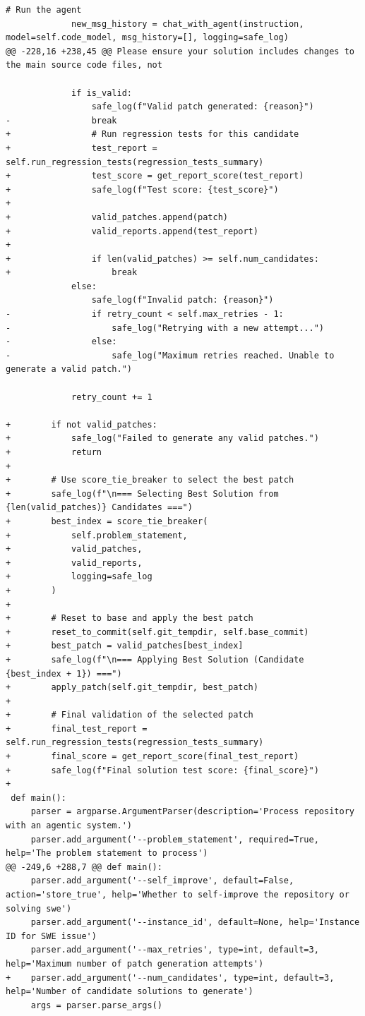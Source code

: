 \documentclass{article}
\begin{document}
\begin{lstlisting}[style=diffstyle]
             # Run the agent
             new_msg_history = chat_with_agent(instruction, model=self.code_model, msg_history=[], logging=safe_log)
@@ -228,16 +238,45 @@ Please ensure your solution includes changes to the main source code files, not
             
             if is_valid:
                 safe_log(f"Valid patch generated: {reason}")
-                break
+                # Run regression tests for this candidate
+                test_report = self.run_regression_tests(regression_tests_summary)
+                test_score = get_report_score(test_report)
+                safe_log(f"Test score: {test_score}")
+
+                valid_patches.append(patch)
+                valid_reports.append(test_report)
+
+                if len(valid_patches) >= self.num_candidates:
+                    break
             else:
                 safe_log(f"Invalid patch: {reason}")
-                if retry_count < self.max_retries - 1:
-                    safe_log("Retrying with a new attempt...")
-                else:
-                    safe_log("Maximum retries reached. Unable to generate a valid patch.")
             
             retry_count += 1
 
+        if not valid_patches:
+            safe_log("Failed to generate any valid patches.")
+            return
+
+        # Use score_tie_breaker to select the best patch
+        safe_log(f"\n=== Selecting Best Solution from {len(valid_patches)} Candidates ===")
+        best_index = score_tie_breaker(
+            self.problem_statement,
+            valid_patches,
+            valid_reports,
+            logging=safe_log
+        )
+
+        # Reset to base and apply the best patch
+        reset_to_commit(self.git_tempdir, self.base_commit)
+        best_patch = valid_patches[best_index]
+        safe_log(f"\n=== Applying Best Solution (Candidate {best_index + 1}) ===")
+        apply_patch(self.git_tempdir, best_patch)
+
+        # Final validation of the selected patch
+        final_test_report = self.run_regression_tests(regression_tests_summary)
+        final_score = get_report_score(final_test_report)
+        safe_log(f"Final solution test score: {final_score}")
+
 def main():
     parser = argparse.ArgumentParser(description='Process repository with an agentic system.')
     parser.add_argument('--problem_statement', required=True, help='The problem statement to process')
@@ -249,6 +288,7 @@ def main():
     parser.add_argument('--self_improve', default=False, action='store_true', help='Whether to self-improve the repository or solving swe')
     parser.add_argument('--instance_id', default=None, help='Instance ID for SWE issue')
     parser.add_argument('--max_retries', type=int, default=3, help='Maximum number of patch generation attempts')
+    parser.add_argument('--num_candidates', type=int, default=3, help='Number of candidate solutions to generate')
     args = parser.parse_args()
 

\end{lstlisting}
\end{document}

